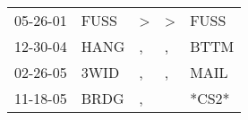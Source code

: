 \begin{supertabular}{lllll}
 05-26-01 &  FUSS &  \textgreater &  \textgreater &   FUSS \\
 12-30-04 &  HANG &             , &             , &   BTTM \\
 02-26-05 &  3WID &             , &             , &   MAIL \\
 11-18-05 &  BRDG &             , &               &  *CS2* \\
\end{supertabular}
